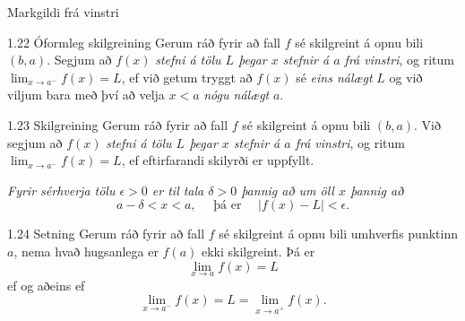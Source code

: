 \documentclass[icelandic,a4paper,12pt]{article}
\begin{document}
\begin{frame}{Markgildi frá vinstri}
\begin{block}{1.22 Óformleg skilgreining}   
Gerum ráð fyrir að fall $f$ sé
skilgreint á opnu bili $(b,a)$.  Segjum að  $f(x)$
{\it stefni á tölu $L$ þegar $x$ stefnir á $a$ frá vinstri}, og ritum
$\lim_{x\rightarrow a^-} f(x)=L$, ef við getum tryggt að  $f(x)$ sé 
{\em eins nálægt}
$L$ og við viljum bara með því að velja $x<a$ {\em nógu nálægt} $a$. 
\end{block}

\pause

\begin{block}{1.23 Skilgreining} Gerum ráð fyrir að fall $f$ sé
skilgreint á opnu bili $(b,a)$.  Við segjum að $f(x)$
{\it stefni á tölu $L$ þegar $x$ stefnir á $a$ frá vinstri}, og ritum
$\lim_{x\rightarrow a^-} f(x)=L$, ef eftirfarandi skilyrði er uppfyllt.

{\it Fyrir sérhverja tölu $\epsilon>0$ er til tala $\delta>0$ þannig
  að um öll $x$ þannig að} 
$$
a-\delta<x<a,\quad \text{ þá er } \quad |f(x)-L|<\epsilon.
$$
\end{block}
\end{frame}

\begin{frame}
\begin{block}{1.24 Setning} Gerum ráð fyrir að fall $f$ sé
skilgreint á opnu bili umhverfis punktinn $a$, nema hvað hugsanlega er
$f(a)$ ekki skilgreint.  Þá er 
$$\lim_{x\rightarrow a} f(x)=L$$
ef og aðeins ef 
$$\lim_{x\rightarrow a^-} f(x)=L=\lim_{x\rightarrow a^+} f(x).$$
\end{block}
\end{frame}


% 
% 
% 
% 
% 
% 
% 
\end{document}
